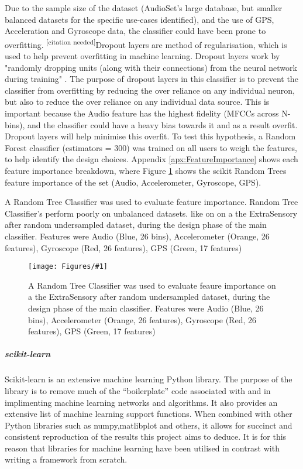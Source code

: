 \documentclass{UoNMCHA}
\newcommand{\citationneeded}{\textsuperscript{\color{blue} [citation needed]}}
\newcommand{\inlineQuote}[1]{``#1''}
\newcommand{\fref}[1] {Figure \ref{#1}}
\newcommand{\fFigure}[3]{
	\begin{figure}[h]
        \begin{center}  
            \texttt{[image: Figures/\#1]}  
            \caption{#2}
            \label{#1}
        \end{center}
	\end{figure}
}
\numberwithin{equation}{section}
\begin{document}
Due to the sample size of the dataset (AudioSet's large database, but smaller balanced datasets for the specific use-cases identified), and the use of GPS, Acceleration and Gyroscope data, the classifier could have been prone to overfitting. \citationneeded Dropout layers are method of regularisation, which is used to help prevent overfitting in machine learning. Dropout layers work by "randomly dropping units (along with their connections) from the neural network during training" \cite{witten2016data}. The purpose of dropout layers in this classifier is to prevent the classifier from overfitting by reducing the over reliance on any individual neuron, but also to reduce the over reliance on any individual data source. This is important because the Audio feature has the highest fidelity (MFCCs across N-bins), and the classifier could have a heavy bias towards it and as a result overfit. Dropout layers will help minimise this overfit. To test this hypothesis, a Random Forest classifier (estimators = 300) was trained on all users to weigh the features, to help identify the design choices. Appendix \ref{apx:FeatureImportance} shows each feature importance breakdown, where \fref{feature_important_just_combined_big_colour.png} shows the scikit Random Trees feature importance of the set (Audio, Accelerometer, Gyroscope, GPS).

A Random Tree Classifier was used to evaluate feature importance. Random Tree Classifier's perform poorly on unbalanced datasets. like on  on a the ExtraSensory after random undersampled dataset, during the design phase of the main classifier. Features were Audio (Blue, 26 bins), Accelerometer (Orange, 26 features), Gyroscope (Red, 26 features), GPS (Green, 17 features)

\fFigure{feature_important_just_combined_big_colour.png}{A Random Tree Classifier was used to evaluate feaure importance on a the ExtraSensory after random undersampled dataset, during the design phase of the main classifier. Features were Audio (Blue, 26 bins), Accelerometer (Orange, 26 features), Gyroscope (Red, 26 features), GPS (Green, 17 features)}{1}




\subparagraph{scikit-learn}
Scikit-learn is an extensive machine learning Python library. The purpose of the library is to remove much of the \inlineQuote{boilerplate} code associated with and in implimenting machine learning networks and algorithms. It also provides an extensive list of machine learning support functions.
When combined with other Python libraries such as numpy,matlibplot and others, it allows for succinct and consistent reproduction of the results this project aims to deduce. It is for this reason that libraries for machine learning have been utilised in contrast with writing a framework from scratch.
\end{document}
